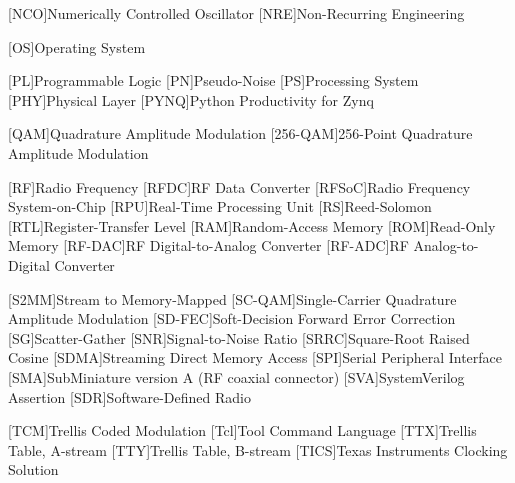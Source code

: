 [NCO]{Numerically Controlled Oscillator}
[NRE]{Non-Recurring Engineering}

[OS]{Operating System}

[PL]{Programmable Logic}
[PN]{Pseudo-Noise}
[PS]{Processing System}
[PHY]{Physical Layer}
[PYNQ]{Python Productivity for Zynq}

[QAM]{Quadrature Amplitude Modulation}
[256-QAM]{256-Point Quadrature Amplitude Modulation}

[RF]{Radio Frequency}
[RFDC]{RF Data Converter}
[RFSoC]{Radio Frequency System-on-Chip}
[RPU]{Real-Time Processing Unit}
[RS]{Reed-Solomon}
[RTL]{Register-Transfer Level}
[RAM]{Random-Access Memory}
[ROM]{Read-Only Memory}
[RF-DAC]{RF Digital-to-Analog Converter}
[RF-ADC]{RF Analog-to-Digital Converter}

[S2MM]{Stream to Memory-Mapped}
[SC-QAM]{Single-Carrier Quadrature Amplitude Modulation}
[SD-FEC]{Soft-Decision Forward Error Correction}
[SG]{Scatter-Gather}
[SNR]{Signal-to-Noise Ratio}
[SRRC]{Square-Root Raised Cosine}
[SDMA]{Streaming Direct Memory Access}
[SPI]{Serial Peripheral Interface}
[SMA]{SubMiniature version A (RF coaxial connector)}
[SVA]{SystemVerilog Assertion}
[SDR]{Software-Defined Radio}

[TCM]{Trellis Coded Modulation}
[Tcl]{Tool Command Language}
[TTX]{Trellis Table, A-stream}
[TTY]{Trellis Table, B-stream}
[TICS]{Texas Instruments Clocking Solution}

